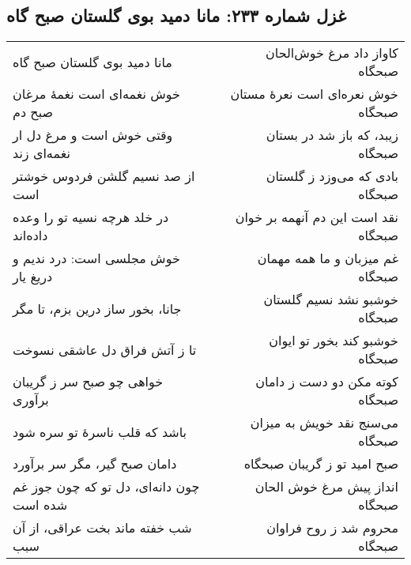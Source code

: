 \begin{center}
\section*{غزل شماره ۲۳۳: مانا دمید بوی گلستان صبح گاه}
\label{sec:233}
\begin{longtable}{l p{0.5cm} r}
مانا دمید بوی گلستان صبح گاه
&&
کاواز داد مرغ خوش‌الحان صبحگاه
\\
خوش نغمه‌ای است نغمهٔ مرغان صبح دم
&&
خوش نعره‌ای است نعرهٔ مستان صبحگاه
\\
وقتی خوش است و مرغ دل ار نغمه‌ای زند
&&
زیبد، که باز شد در بستان صبحگاه
\\
از صد نسیم گلشن فردوس خوشتر است
&&
بادی که می‌وزد ز گلستان صبحگاه
\\
در خلد هرچه نسیه تو را وعده داده‌اند
&&
نقد است این دم آنهمه بر خوان صبحگاه
\\
خوش مجلسی است: درد ندیم و دریغ یار
&&
غم میزبان و ما همه مهمان صبحگاه
\\
جانا، بخور ساز درین بزم، تا مگر
&&
خوشبو نشد نسیم گلستان صبحگاه
\\
تا ز آتش فراق دل عاشقی نسوخت
&&
خوشبو کند بخور تو ایوان صبحگاه
\\
خواهی چو صبح سر ز گریبان برآوری
&&
کوته مکن دو دست ز دامان صبحگاه
\\
باشد که قلب ناسرهٔ تو سره شود
&&
می‌سنج نقد خویش به میزان صبحگاه
\\
دامان صبح گیر، مگر سر برآورد
&&
صبح امید تو ز گریبان صبحگاه
\\
چون دانه‌ای، دل تو که چون جوز غم شده است
&&
انداز پیش مرغ خوش الحان صبحگاه
\\
شب خفته ماند بخت عراقی، از آن سبب
&&
محروم شد ز روح فراوان صبحگاه
\\
\end{longtable}
\end{center}
